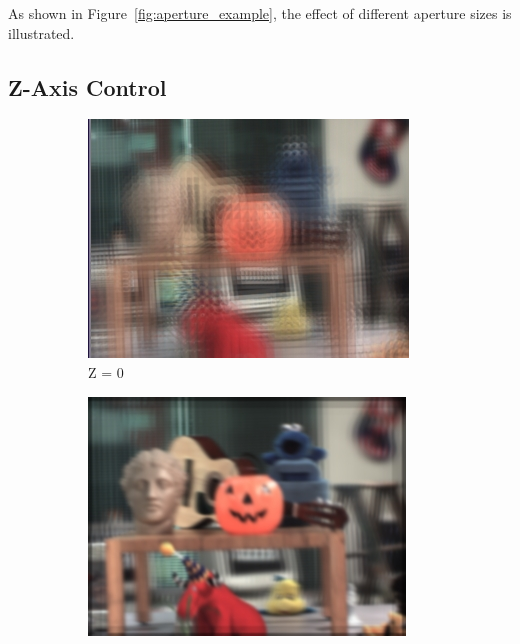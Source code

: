 \documentclass{article}
\begin{document}
As shown in Figure~\ref{fig:aperture_example}, the effect of different aperture sizes is illustrated.

\subsection{Z-Axis Control}
\begin{figure}[htbp]
    \centering
    \begin{subfigure}[b]{0.24\textwidth} %
        \centering
        \includegraphics[width=\textwidth]{z=0.png} %
        \caption{Z = 0} %
    \end{subfigure}
    \hfill
    \begin{subfigure}[b]{0.24\textwidth} %
        \centering
        \includegraphics[width=\textwidth]{ap=0.png} %

\end{subfigure}
\end{figure}
\end{document}
